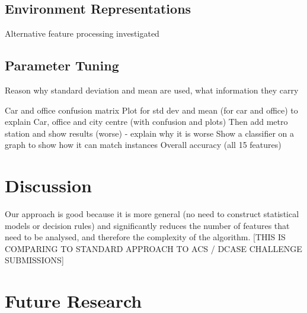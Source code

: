 \documentclass[11pt]{article}
\begin{document}
\subsection{Environment Representations}

Alternative feature processing investigated



\subsection{Parameter Tuning}

%
%
%



Reason why standard deviation and mean are used, what information they carry


Car and office confusion matrix
Plot for std dev and mean (for car and office) to explain
Car, office and city centre (with confusion and plots)
Then add metro station and show results (worse) - explain why it is worse
Show a classifier on a graph to show how it can match instances
Overall accuracy (all 15 features)


\section{Discussion}


Our approach is good because it is more general (no need to construct statistical models or decision rules) and significantly reduces the number of features that need to be analysed, and therefore the complexity of the algorithm. [THIS IS COMPARING TO STANDARD APPROACH TO ACS / DCASE CHALLENGE SUBMISSIONS]







\section{Future Research}
\end{document}
